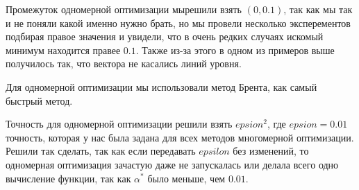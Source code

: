 Промежуток одномерной оптимизации мырешили взять $(0, 0.1)$, так как мы так и не поняли
какой именно нужно брать, но мы провели несколько эксперементов подбирая правое значения и увидели,
что в очень редких случаях искомый минимум находится правее $0.1$. Также из-за этого в одном из примеров выше 
получилось так, что вектора не касались линий уровня.

Для одномерной оптимизации мы использовали метод Брента, как самый быстрый метод.

Точность для одномерной оптимизации решили взять $epsion^2$, где $epsion = 0.01$ точность, которая у нас была
задана для всех методов многомерной оптимизации. Решили так сделать, так как если передавать $epsilon$ без
изменений, то одномерная оптимизация зачастую даже не запускалась или делала всего одно вычисление функции,
так как $\alpha^*$ было меньше, чем $0.01$.

\begin{flushleft}
\end{flushleft}


\begin{flushleft}
\end{flushleft}



